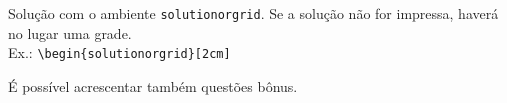 \documentclass[a4paper, 11pt, addpoints]{exam}
\begin{document}
\begin{questions}
\begin{solutionordottedlines}
			\end{solutionordottedlines}
			\begin{solutionorgrid}
				Solução com o ambiente \texttt{solutionorgrid}. Se a solução não for impressa, haverá no lugar uma grade.\\
                Ex.: \verb*|\begin{solutionorgrid}[2cm]|
			\end{solutionorgrid}
		\bonusquestion[1]
		É possível acrescentar também questões bônus.
	\end{questions}
	
\end{document}
